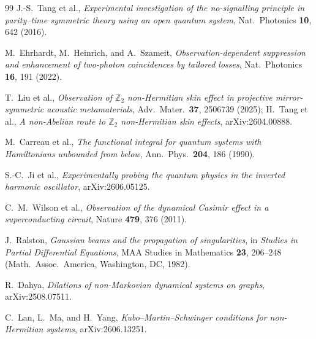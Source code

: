 \documentclass[11pt]{article}
\theoremstyle{definition}
\theoremstyle{remark}
\begin{document}
\begin{thebibliography}{99}
J.-S.~Tang et al.,
\emph{Experimental investigation of the no-signalling principle in
parity--time symmetric theory using an open quantum system},
Nat.\ Photonics \textbf{10}, 642 (2016).

M.~Ehrhardt, M.~Heinrich, and A.~Szameit,
\emph{Observation-dependent suppression and enhancement of
two-photon coincidences by tailored losses},
Nat.\ Photonics \textbf{16}, 191 (2022).

T.~Liu et al.,
\emph{Observation of $\mathbb Z_2$ non-Hermitian skin effect in
projective mirror-symmetric acoustic metamaterials},
Adv.\ Mater.\ \textbf{37}, 2506739 (2025);
H.~Tang et al.,
\emph{A non-Abelian route to $\mathbb Z_2$ non-Hermitian skin
effects},
arXiv:2604.00888.

M.~Carreau et al.,
\emph{The functional integral for quantum systems with Hamiltonians
unbounded from below},
Ann.\ Phys.\ \textbf{204}, 186 (1990).

S.-C.~Ji et al.,
\emph{Experimentally probing the quantum physics in the inverted
harmonic oscillator},
arXiv:2606.05125.

C.~M.~Wilson et al.,
\emph{Observation of the dynamical Casimir effect in a
superconducting circuit},
Nature \textbf{479}, 376 (2011).

J.~Ralston,
\emph{Gaussian beams and the propagation of singularities},
in \emph{Studies in Partial Differential Equations}, MAA Studies in
Mathematics \textbf{23}, 206--248 (Math.\ Assoc.\ America, Washington,
DC, 1982).

R.~Dahya,
\emph{Dilations of non-Markovian dynamical systems on graphs},
arXiv:2508.07511.

C.~Lan, L.~Ma, and H.~Yang,
\emph{Kubo--Martin--Schwinger conditions for non-Hermitian systems},
arXiv:2606.13251.

\end{thebibliography}
\end{document}
